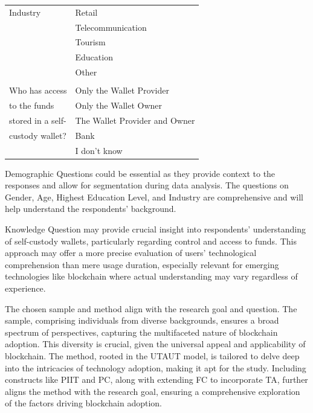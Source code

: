 \documentclass[twocolumn]{article}
\begin{document}
\begin{table}[H]
\begin{tabular}{p{2.5cm}p{5cm}}
Industry                                              & Retail \\
                                                      & Telecommunication \\
                                                      & Tourism \\
                                                      & Education \\
                                                      & Other \\
\\Who has access                                        & Only the Wallet Provider \\
to the funds                                          & Only the Wallet Owner \\
stored in a self-                                     & The Wallet Provider and Owner \\
custody wallet?                                       & Bank 
\\                                                    & I don't know \\
 \hline
\end{tabular}
\end{table}

Demographic Questions could be essential as they provide context to the responses and allow for segmentation during data analysis. The questions on Gender, Age, Highest Education Level, and Industry are comprehensive and will help understand the respondents' background.

Knowledge Question may provide crucial insight into respondents' understanding of self-custody wallets, particularly regarding control and access to funds. This approach may offer a more precise evaluation of users' technological comprehension than mere usage duration, especially relevant for emerging technologies like blockchain where actual understanding may vary regardless of experience.

The chosen sample and method align with the research goal and question. The sample, comprising individuals from diverse backgrounds, ensures a broad spectrum of perspectives, capturing the multifaceted nature of blockchain adoption. This diversity is crucial, given the universal appeal and applicability of blockchain. The method, rooted in the UTAUT model, is tailored to delve deep into the intricacies of technology adoption, making it apt for the study. Including constructs like PIIT and PC, along with extending FC to incorporate TA, further aligns the method with the research goal, ensuring a comprehensive exploration of the factors driving blockchain adoption.
\end{document}

